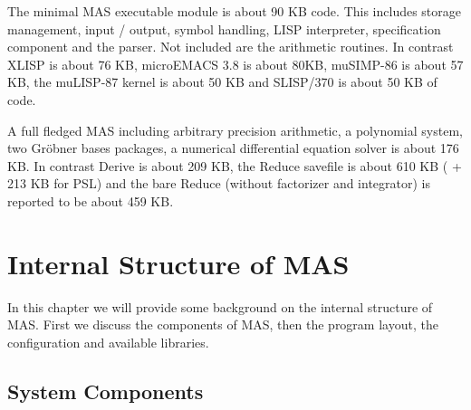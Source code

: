 The minimal MAS executable module is about 90 KB code. 
This includes storage management, input / output, symbol handling,
LISP interpreter, specification component and the parser. 
Not included are the 
arithmetic routines.
In contrast XLISP is about 76 KB,
microEMACS 3.8 is about 80KB,
muSIMP-86 is about 57 KB, 
the muLISP-87 kernel is about 50 KB 
and SLISP/370 is about 50 KB of code. 

A full fledged MAS including arbitrary precision arithmetic,
a polynomial system, two Gr\"obner bases packages, a 
numerical 
differential equation solver is about 176 KB.
In contrast Derive is about 209 KB, the
Reduce savefile is about 610 KB 
( + 213 KB for PSL)
and the bare Reduce (without factorizer and integrator)
is reported to be about 459 KB.


\chapter{Internal Structure of MAS} %

In this chapter we will provide some background 
on the internal structure of MAS. 
First we discuss the components of MAS, then 
the program layout, the configuration and available 
libraries.


\section{System Components}

